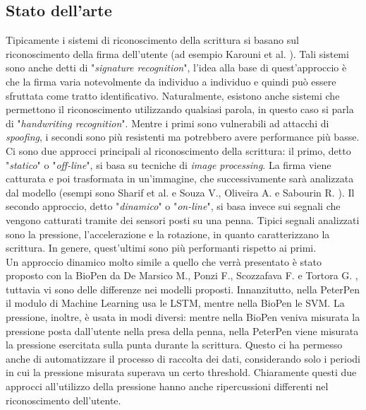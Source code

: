 \documentclass[8pt,notitlepage]{report}
\begin{document}
\subsection*{Stato dell'arte}
	Tipicamente i sistemi di riconoscimento della scrittura si basano sul riconoscimento della firma dell'utente (ad esempio Karouni et al. \cite{Karouni15}). Tali sistemi sono anche detti di "\textit{signature recognition}", l'idea alla base di quest'approccio è che la firma varia notevolmente da individuo a individuo e quindi può essere sfruttata come tratto identificativo. Naturalmente, esistono anche sistemi che permettono il riconoscimento utilizzando qualsiasi parola, in questo caso si parla di "\textit{handwriting recognition}". Mentre i primi sono vulnerabili ad attacchi di \textit{spoofing}, i secondi sono più resistenti ma potrebbero avere performance più basse. \\
	Ci sono due approcci principali al riconoscimento della scrittura: il primo, detto "\textit{statico}" o "\textit{off-line}", si basa su tecniche di \textit{image processing}. La firma viene catturata e poi trasformata in un'immagine, che successivamente sarà analizzata dal modello (esempi sono Sharif et al.\cite{Sharif18} e Souza V., Oliveira A. e Sabourin R. \cite{Souza18}). Il secondo approccio, detto "\textit{dinamico}" o "\textit{on-line}", si basa invece sui segnali che vengono catturati tramite dei sensori posti su una penna. Tipici segnali analizzati sono la pressione, l'accelerazione e la rotazione, in quanto caratterizzano la scrittura. In genere, quest'ultimi sono più performanti rispetto ai primi. \\
	Un approccio dinamico molto simile a quello che verrà presentato è stato proposto con la BioPen da De Marsico M., Ponzi F., Scozzafava F. e Tortora G. \cite{DeMarsico18}, tuttavia vi sono delle differenze nei modelli proposti. Innanzitutto, nella PeterPen il modulo di Machine Learning usa le LSTM, mentre nella BioPen le SVM. La pressione, inoltre, è usata in modi diversi: mentre nella BioPen veniva misurata la pressione posta dall'utente nella presa della penna, nella PeterPen viene misurata la pressione esercitata sulla punta durante la scrittura. Questo ci ha permesso anche di automatizzare il processo di raccolta dei dati, considerando solo i periodi in cui la pressione misurata superava un certo threshold. Chiaramente questi due approcci all'utilizzo della pressione hanno anche ripercussioni differenti nel riconoscimento dell'utente. 

	
\end{document}
